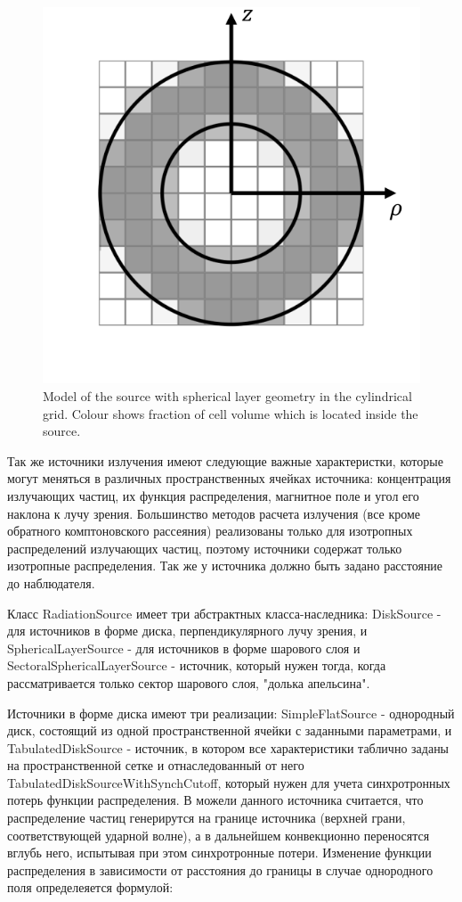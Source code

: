 \begin{figure}[h]
	\centering
	\includegraphics[width=10.5 cm]{./fig/sphericalSource.png} 
	\caption{Model of the source with spherical layer geometry in the cylindrical grid. Colour shows fraction of cell volume which is located inside the source.}
	\label{sphericalLayer}
\end{figure}

Так же источники излучения имеют следующие важные характеристки, которые могут меняться в различных пространственных ячейках источника: концентрация излучающих частиц, их функция распределения, магнитное поле и угол его наклона к лучу зрения. Большинство методов расчета излучения (все кроме обратного комптоновского рассеяния) реализованы только для изотропных распределений излучающих частиц, поэтому источники содержат только изотропные распределения. Так же у источника должно быть задано расстояние до наблюдателя.

Класс RadiationSource имеет три абстрактных класса-наследника: DiskSource - для источников в форме диска, перпендикулярного лучу зрения, и SphericalLayerSource - для источников в форме шарового слоя и SectoralSphericalLayerSource - источник, который нужен тогда, когда рассматривается только сектор шарового слоя, "долька апельсина". 

Источники в форме диска имеют три реализации: SimpleFlatSource - однородный диск, состоящий из одной пространственной ячейки с заданными параметрами, и TabulatedDiskSource - источник, в котором все характеристики таблично заданы на пространственной сетке и отнаследованный от него TabulatedDiskSourceWithSynchCutoff, который нужен для учета синхротронных потерь функции распределения. В можели данного источника считается, что распределение частиц генерирутся на границе источника (верхней грани, соответствующей ударной волне), а в дальнейшем конвекционно переносятся вглубь него, испытывая при этом синхротронные потери. Изменение функции распределения в зависимости от расстояния до границы в случае однородного поля определеяется формулой:

